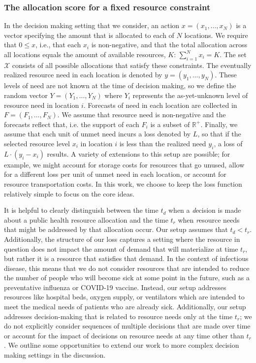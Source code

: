 \documentclass{article}\usepackage[]{graphicx}\usepackage[]{xcolor}
\begin{document}
\subsubsection{The allocation score for a fixed resource constraint}
\label{sec:methods.detailed.specific_allocation}

In the decision making setting that we consider, an action $x = (x_1, \ldots, x_N)$ is a vector specifying the amount that is allocated to each of $N$ locations. We require that $0 \leq x$, i.e., that each $x_i$ is non-negative, and that the total allocation across all locations equals the amount of available resources, $K$: $\sum_{i=1}^N x_i = K$. The set $\mathcal{X}$ consists of all possible allocations that satisfy these constraints. The eventually realized resource need in each location is denoted by $y = (y_1, \ldots, y_N)$. These levels of need are not known at the time of decision making, so we define the random vector $Y = (Y_1, \ldots, Y_N)$ where $Y_i$ represents the as-yet-unknown level of resource need in location $i$. Forecasts of need in each location are collected in $F = (F_1, \ldots, F_N)$. We assume that resource need is non-negative and the forecasts reflect that, i.e. the support of each $F_i$ is a subset of $\mathbb{R}^+$. Finally, we assume that each unit of unmet need incurs a loss denoted by $L$, so that if the selected resource level $x_i$ in location $i$ is less than the realized need $y_i$, a loss of $L \cdot (y_i - x_i)$ results. A variety of extensions to this setup are possible; for example, we might account for storage costs for resources that go unused, allow for a different loss per unit of unmet need in each location, or account for resource transportation costs. In this work, we choose to keep the loss function relatively simple to focus on the core ideas.

It is helpful to clearly distinguish between the time $t_d$ when a \emph{d}ecision is made about a public health resource allocation and the time $t_r$ when \emph{r}esource needs that might be addressed by that allocation occur. Our setup assumes that $t_d < t_r$. Additionally, the structure of our loss captures a setting where the resource in question does not impact the amount of demand that will materialize at time $t_r$, but rather it is a resource that satisfies that demand. In the context of infectious disease, this means that we do not consider resources that are intended to reduce the number of people who will become sick at some point in the future, such as a preventative influenza or COVID-19 vaccine. Instead, our setup addresses resources like hospital beds, oxygen supply, or ventilators which are intended to meet the medical needs of patients who are already sick. Additionally, our setup addresses decision-making that is related to resource needs only at the time $t_r$; we do not explicitly consider sequences of multiple decisions that are made over time or account for the impact of decisions on resource needs at any time other than $t_r$. We outline some opportunities to extend our work to more complex decision making settings in the discussion.
\end{document}
